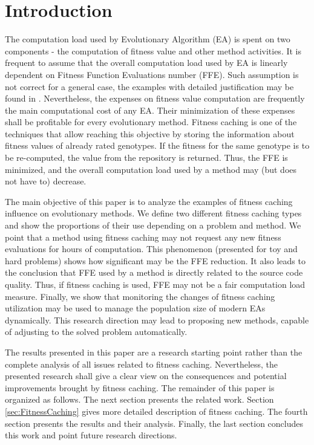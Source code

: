 \section{Introduction}
The computation load used by Evolutionary Algorithm (EA) is spent on two components - the computation of fitness value and other method activities. It is frequent to assume that the overall computation load used by EA is linearly dependent on Fitness Function Evaluations number (FFE). Such assumption is not correct for a general case, the examples with detailed justification may be found in \cite{MuPPetSeon,PEACh,MuPPetS}. Nevertheless, the expenses on fitness value computation are frequently the main computational cost of any EA. Their minimization of these expenses shall be profitable for every evolutionary method. Fitness caching is one of the techniques that allow reaching this objective by storing the information about fitness values of already rated genotypes. If the fitness for the same genotype is to be re-computed, the value from the repository is returned. Thus, the FFE is minimized, and the overall computation load used by a method may (but does not have to) decrease. \par
The main objective of this paper is to analyze the examples of fitness caching influence on evolutionary methods. We define two different fitness caching types and show the proportions of their use depending on a problem and method. We point that a method using fitness caching may not request any new fitness evaluations for hours of computation. This phenomenon (presented for toy and hard problems) shows how significant may be the FFE reduction. It also leads to the conclusion that FFE used by a method is directly related to the source code quality. Thus, if fitness caching is used, FFE may not be a fair computation load measure. Finally, we show that monitoring the changes of fitness caching utilization may be used to manage the population size of modern EAs dynamically. This research direction may lead to proposing new methods, capable of adjusting to the solved problem automatically.\par

The results presented in this paper are a research starting point rather than the complete analysis of all issues related to fitness caching. Nevertheless, the presented research shall give a clear view on the consequences and potential improvements brought by fitness caching. The remainder of this paper is organized as follows. The next section presents the related work. Section \ref{sec:FitnessCaching} gives more detailed description of fitness caching. The fourth section presents the results and their analysis. Finally, the last section concludes this work and point future research directions.

